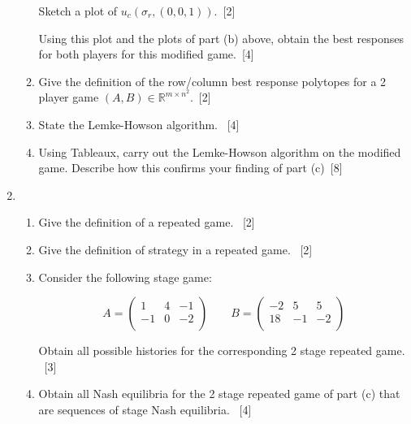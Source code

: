 \documentclass[12pt,a4paper]{article}
\begin{document}
\begin{enumerate}
\begin{enumerate}
            Sketch a plot of \(u_c(\sigma_r, (0, 0, 1))\).~\hfill{[2]}

            Using this plot and the plots of part (b) above, obtain the best
            responses for both players for this modified game.~\hfill{[4]}

        \item Give the definition of the row/column best response polytopes for
            a 2 player game \((A, B)\in\mathbb{R}^{{m\times n}^2}\).~\hfill{[2]}

        \item State the Lemke-Howson algorithm.
              ~\hfill{[4]}

        \item Using Tableaux, carry out the Lemke-Howson algorithm on the
            modified game. Describe how this confirms your finding of part
            (c)~\hfill{[8]}
    \end{enumerate}

\newpage
\item

    \begin{enumerate}
        \item Give the definition of a repeated game.
            ~\hfill{[2]}
        \item Give the definition of strategy in a repeated game.
            ~\hfill{[2]}

        \item Consider the following stage
            game:

            \[
                A = \begin{pmatrix}
                    1 & 4 & -1\\
                    -1 & 0 & -2\\
                    \end{pmatrix}
                \qquad
                B = \begin{pmatrix}
                    -2 & 5 & 5\\
                    18 & -1 & -2\\
                    \end{pmatrix}
            \]


            Obtain all possible histories for the corresponding 2 stage repeated
            game.
            ~\hfill{[3]}

        \item Obtain all Nash equilibria for the 2 stage repeated game of
            part (c)
            that are sequences
            of stage Nash equilibria.
            ~\hfill{[4]}


\end{enumerate}
\end{enumerate}
\end{document}
